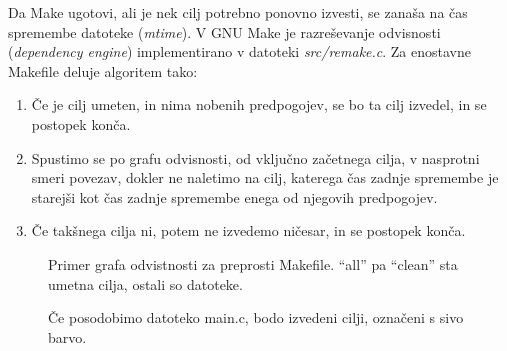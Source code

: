 \documentclass[notitlepage]{report}
\begin{document}
Da Make ugotovi, ali je nek cilj potrebno ponovno izvesti, se zanaša
na čas spremembe datoteke (\textit{mtime}). V GNU Make je razreševanje
odvisnosti (\textit{dependency engine}) implementirano v datoteki
\textit{src/remake.c}. Za enostavne Makefile deluje algoritem tako:

\begin{enumerate}
\item Če je cilj umeten, in nima nobenih predpogojev, se bo ta cilj
  izvedel, in se postopek konča.
\item Spustimo se po grafu odvisnosti, od vključno začetnega cilja, v
  nasprotni smeri povezav, dokler ne naletimo na cilj, katerega čas
  zadnje spremembe je starejši kot čas zadnje spremembe enega od
  njegovih predpogojev.
\item Če takšnega cilja ni, potem ne izvedemo
  ničesar, in se postopek konča.
\end{enumerate}

\begin{figure}[H]
  \begin{center}
  \caption{Primer grafa odvistnosti za preprosti Makefile. ``all'' pa
    ``clean'' sta umetna cilja, ostali so datoteke.}
\end{center}
\end{figure}

\begin{figure}[H]
  \begin{center}
  \caption{Če posodobimo datoteko main.c, bodo izvedeni cilji, označeni s
    sivo barvo.}
  \end{center}
\end{figure}
\end{document}
